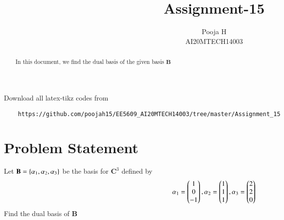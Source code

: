 \documentclass[journal,12pt,twocolumn]{IEEEtran}
\begin{document}
	\makeatother
	\let\StandardTheFigure\thefigure
	\let\vec\mathbf
	\renewcommand{\thefigure}{\theproblem}
	\def\putbox#1#2#3{\makebox[0in][l]{\makebox[#1][l]{}\raisebox{\baselineskip}[0in][0in]{\raisebox{#2}[0in][0in]{#3}}}}
	\def\rightbox#1{\makebox[0in][r]{#1}}
	\def\centbox#1{\makebox[0in]{#1}}
	\def\topbox#1{\raisebox{-\baselineskip}[0in][0in]{#1}}
	\def\midbox#1{\raisebox{-0.5\baselineskip}[0in][0in]{#1}}
	\vspace{3cm}
	\title{Assignment-15}
	\author{Pooja H \\ AI20MTECH14003}
	\maketitle
	\newpage
	\bigskip
	\renewcommand{\thefigure}{\theenumi}
	\renewcommand{\thetable}{\theenumi}
	\begin{abstract}
		In this document, we find the dual basis of the given basis $\vec{B}$ 
	\end{abstract}
	Download all latex-tikz codes from 
\begin{lstlisting}
	https://github.com/poojah15/EE5609_AI20MTECH14003/tree/master/Assignment_15
\end{lstlisting}
	\section{Problem Statement}
	Let $\vec{B} = \cbrak{\alpha_1, \alpha_2, \alpha_3}$ be the basis for $\vec{C}^3$ defined by
	\begin{align}
		\alpha_1 = \begin{pmatrix}1\\0\\-1\end{pmatrix}, \alpha_2 = \begin{pmatrix}1\\1\\1\end{pmatrix}, \alpha_3 = \begin{pmatrix}2\\2\\0\end{pmatrix}  
	\end{align}
Find the dual basis of $\vec{B}$
\end{document}
